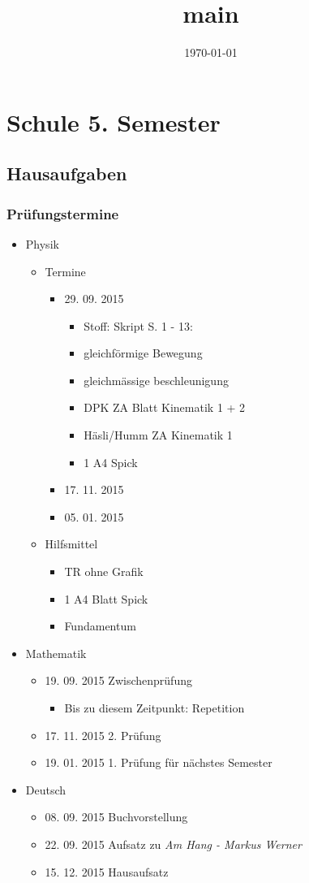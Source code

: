 \documentclass[11pt]{article}
\date{\today}
\title{main}
\begin{document}
\maketitle
\tableofcontents

\section{Schule 5. Semester}
\label{sec-1}
\subsection{Hausaufgaben}
\label{sec-1-1}
\subsubsection{Prüfungstermine}
\label{sec-1-1-1}
\begin{itemize}
\item Physik
\begin{itemize}
\item Termine 
\begin{itemize}
\item 29. 09. 2015
\begin{itemize}
\item Stoff: Skript S. 1 - 13:
\item gleichförmige Bewegung
\item gleichmässige beschleunigung
\item DPK ZA Blatt Kinematik 1 + 2
\item Häsli/Humm ZA Kinematik 1
\item 1 A4 Spick
\end{itemize}
\item 17. 11. 2015
\item 05. 01. 2015
\end{itemize}
\item Hilfsmittel
\begin{itemize}
\item TR ohne Grafik
\item 1 A4 Blatt Spick
\item Fundamentum
\end{itemize}
\end{itemize}
\item Mathematik
\begin{itemize}
\item 19. 09. 2015 Zwischenprüfung
\begin{itemize}
\item Bis zu diesem Zeitpunkt: Repetition
\end{itemize}
\item 17. 11. 2015 2. Prüfung
\item 19. 01. 2015 1. Prüfung für nächstes Semester
\end{itemize}
\item Deutsch
\begin{itemize}
\item 08. 09. 2015 Buchvorstellung
\item 22. 09. 2015 Aufsatz zu \emph{Am Hang - Markus Werner}
\item 15. 12. 2015 Hausaufsatz
\end{itemize}
\end{itemize}
\end{document}
